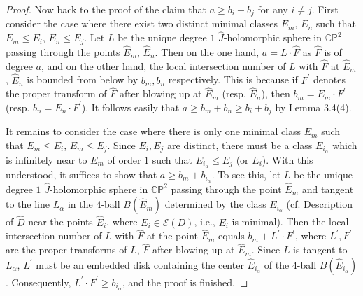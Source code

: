 \documentclass[11pt]{amsart}
\theoremstyle{plain}
\numberwithin{theorem}{section}
\theoremstyle{definition}
\newcommand{\C}{{\mathbb C}}
\renewcommand{\P}{{\mathbb P}}
\newcommand{\E}{{\mathcal E}}
\begin{document}
\begin{proof}
Now back to the proof of the claim that $a\geq b_{i}+b_{j}$ for any $i\neq j$. First consider the case where
there exist two distinct minimal classes $E_m$, $E_n$ such that $E_m\leq E_i$, $E_n\leq E_j$.
Let $L$ be the unique degree $1$ $\hat{J}$-holomorphic sphere in $\C\P^2$ passing through 
the points $\hat{E}_m$, $\hat{E}_n$. Then on the one hand, $a=L\cdot \hat{F}$ as $\hat{F}$ is of
degree $a$, and on the other hand, the local intersection number of $L$ with $\hat{F}$ at
$\hat{E}_m$, $\hat{E}_n$ is bounded from below by $b_m, b_n$ respectively. This is because if 
$F^\prime$ denotes the proper transform of $\hat{F}$ after blowing up at $\hat{E}_m$ (resp. 
$\hat{E}_n$), then $b_m=E_m\cdot F^\prime$ (resp. $b_n=E_n\cdot F^\prime$). It follows easily that
$a\geq b_m+b_n\geq b_i+b_j$ by Lemma 3.4(4). 

It remains to consider the case where there is only one minimal class $E_m$ such that $E_m\leq E_i$,
$E_m\leq E_j$. Since $E_i,E_j$ are distinct, there must be a class $E_{i_\alpha}$ which is infinitely near 
to $E_m$ of order $1$ such that $E_{i_\alpha}\leq E_j$ (or $E_i$). With this understood, it suffices to
show that $a\geq b_m+b_{i_\alpha}$. To see this, let $L$ be the unique degree $1$ $\hat{J}$-holomorphic 
sphere in $\C\P^2$ passing through the point $\hat{E}_m$ and tangent to the line $L_\alpha$ in the $4$-ball $B(\hat{E}_m)$ determined by the class $E_{i_\alpha}$ (cf. Description of $\hat{D}$ near the points $\hat{E}_i$, where $E_i\in\E(D)$, i.e., $E_i$ is minimal). Then the local intersection number of $L$ with $\hat{F}$ at the 
point $\hat{E}_m$ equals $b_m+L^\prime\cdot F^\prime$, where $L^\prime,F^\prime$ are the proper transforms of $L$, $\hat{F}$ after blowing up at $\hat{E}_m$. Since $L$ is tangent to $L_\alpha$, $L^\prime$ must be an embedded disk containing 
the center $\hat{E}_{i_\alpha}$ of the $4$-ball $B(\hat{E}_{i_\alpha})$. Consequently, 
$L^\prime\cdot F^\prime\geq b_{i_\alpha}$, and the proof is finished. 
\end{proof}
\end{document}
